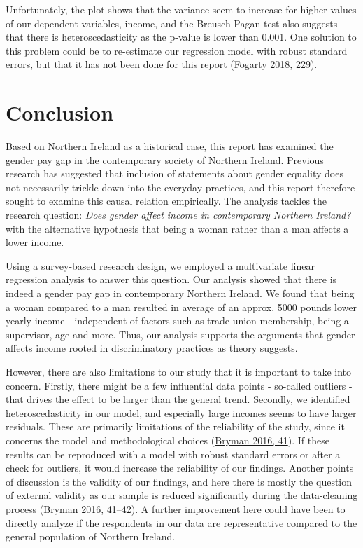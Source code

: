 \documentclass[
]{article}
\begin{document}
Unfortunately, the plot shows that the variance seem to increase for
higher values of our dependent variables, income, and the Breusch-Pagan
test also suggests that there is heteroscedasticity as the p-value is
lower than 0.001. One solution to this problem could be to re-estimate
our regression model with robust standard errors, but that it has not
been done for this report
(\protect\hyperlink{ref-fogarty2018quantitative}{Fogarty 2018, 229}).

\hypertarget{conclusion}{%
\section{Conclusion}\label{conclusion}}

Based on Northern Ireland as a historical case, this report has examined
the gender pay gap in the contemporary society of Northern Ireland.
Previous research has suggested that inclusion of statements about
gender equality does not necessarily trickle down into the everyday
practices, and this report therefore sought to examine this causal
relation empirically. The analysis tackles the research question:
\emph{Does gender affect income in contemporary Northern Ireland?} with
the alternative hypothesis that being a woman rather than a man affects
a lower income.

Using a survey-based research design, we employed a multivariate linear
regression analysis to answer this question. Our analysis showed that
there is indeed a gender pay gap in contemporary Northern Ireland. We
found that being a woman compared to a man resulted in average of an
approx. 5000 pounds lower yearly income - independent of factors such as
trade union membership, being a supervisor, age and more. Thus, our
analysis supports the arguments that gender affects income rooted in
discriminatory practices as theory suggests.

However, there are also limitations to our study that it is important to
take into concern. Firstly, there might be a few influential data points
- so-called outliers - that drives the effect to be larger than the
general trend. Secondly, we identified heteroscedasticity in our model,
and especially large incomes seems to have larger residuals. These are
primarily limitations of the reliability of the study, since it concerns
the model and methodological choices
(\protect\hyperlink{ref-bryman2016social}{Bryman 2016, 41}). If these
results can be reproduced with a model with robust standard errors or
after a check for outliers, it would increase the reliability of our
findings. Another points of discussion is the validity of our findings,
and here there is mostly the question of external validity as our sample
is reduced significantly during the data-cleaning process
(\protect\hyperlink{ref-bryman2016social}{Bryman 2016, 41--42}). A
further improvement here could have been to directly analyze if the
respondents in our data are representative compared to the general
population of Northern Ireland.
\end{document}
